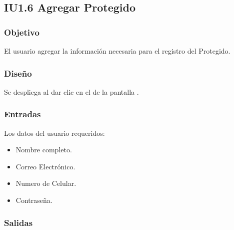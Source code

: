 \newpage
\subsection{IU1.6 Agregar Protegido}

\subsubsection{Objetivo}
	El usuario agregar la información necesaria para el registro del Protegido.

\subsubsection{Diseño}
	Se despliega al dar clic en el  de la pantalla .


\subsubsection{Entradas}
Los datos del usuario requeridos:
\begin{itemize}
	\item Nombre completo.
	\item Correo Electrónico.
	\item Numero de Celular.
	\item Contraseña.
\end{itemize}

\subsubsection{Salidas}
\begin{Citemize}
	\item {}
	\item {}
	\item {}
	\item {}
	\item {}
	\item {}
	\item {}
	\item {}
\end{Citemize}
